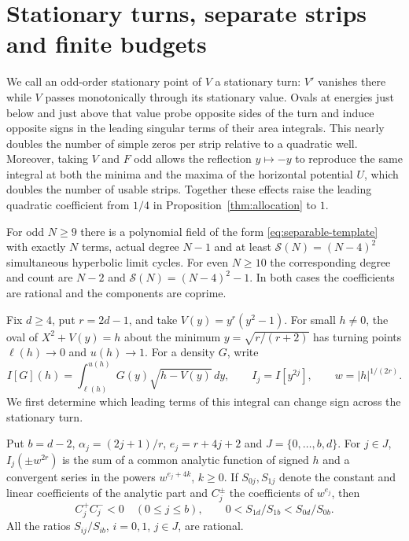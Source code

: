 \section{Stationary turns, separate strips and finite budgets}\label{sec:comparison}

We call an odd-order stationary point of \(V\) a stationary turn: \(V'\) vanishes there while \(V\) passes monotonically through its stationary value. Ovals at energies just below and just above that value probe opposite sides of the turn and induce opposite signs in the leading singular terms of their area integrals. This nearly doubles the number of simple zeros per strip relative to a quadratic well. Moreover, taking \(V\) and \(F\) odd allows the reflection \(y\mapsto -y\) to reproduce the same integral at both the minima and the maxima of the horizontal potential \(U\), which doubles the number of usable strips. Together these effects raise the leading quadratic coefficient from \(1/4\) in Proposition~\ref{thm:allocation} to \(1\).

\begin{proposition}\label{prop:stationary-budget}
For odd \(N\ge9\) there is a polynomial field of the form \eqref{eq:separable-template} with exactly \(N\) terms, actual degree \(N-1\) and at least \(\mathcal S(N)=(N-4)^2\) simultaneous hyperbolic limit cycles. For even \(N\ge10\) the corresponding degree and count are \(N-2\) and \(\mathcal S(N)=(N-4)^2-1\). In both cases the coefficients are rational and the components are coprime.
\end{proposition}

Fix \(d\ge4\), put \(r=2d-1\), and take \(V(y)=y^r(y^2-1)\).
For small \(h\ne0\), the oval of \(X^2+V(y)=h\) about the minimum
\(y=\sqrt{r/(r+2)}\) has turning points \(\ell(h)\to0\) and \(u(h)\to1\).
For a density \(G\), write
\[
 I[G](h)=\int_{\ell(h)}^{u(h)}G(y)\sqrt{h-V(y)}\,dy,\qquad
 I_j=I[y^{2j}],\qquad w=|h|^{1/(2r)} .
\]
We first determine which leading terms of this integral can change sign across the stationary turn.

\begin{lemma}\label{lem:stationary-moments}
Put \(b=d-2\), \(\alpha_j=(2j+1)/r\), \(e_j=r+4j+2\) and
\(J=\{0,\ldots,b,d\}\). For \(j\in J\), \(I_j(\pm w^{2r})\) is the sum of a common analytic function of signed \(h\) and a convergent series in the powers \(w^{e_j+4k}\), \(k\ge0\).
If \(S_{0j},S_{1j}\) denote the constant and linear coefficients of the analytic part and \(C_j^\pm\) the coefficients of \(w^{e_j}\), then
\[
 C_j^+C_j^-<0\quad (0\le j\le b),\qquad
 0< S_{1d}/S_{1b}<S_{0d}/S_{0b}.
\]
All the ratios \(S_{ij}/S_{ib}\), \(i=0,1\), \(j\in J\), are rational.
\end{lemma}

